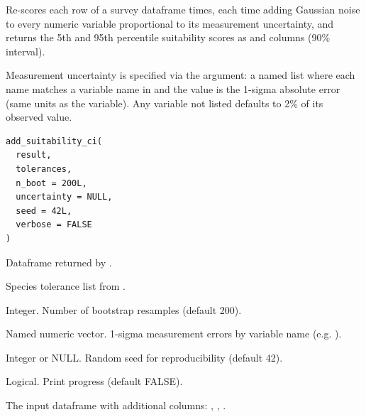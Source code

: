 \documentclass[a4paper]{book}
\begin{document}
%
\begin{Description}
Re-scores each row of a survey dataframe  times, each time adding
Gaussian noise to every numeric variable proportional to its measurement
uncertainty, and returns the 5th and 95th percentile suitability scores as
 and  columns (90\% interval).

Measurement uncertainty is specified via the  argument: a named
list where each name matches a variable name in 
and the value is the 1-sigma absolute error (same units as the variable).
Any variable not listed defaults to 2\% of its observed value.
\end{Description}
%
\begin{Usage}
\begin{verbatim}
add_suitability_ci(
  result,
  tolerances,
  n_boot = 200L,
  uncertainty = NULL,
  seed = 42L,
  verbose = FALSE
)
\end{verbatim}
\end{Usage}
%
\begin{Arguments}
\begin{ldescription}
\item[\code{result}] Dataframe returned by .

\item[\code{tolerances}] Species tolerance list from .

\item[\code{n\_boot}] Integer. Number of bootstrap resamples (default 200).

\item[\code{uncertainty}] Named numeric vector. 1-sigma measurement errors by
variable name (e.g. ).

\item[\code{seed}] Integer or NULL. Random seed for reproducibility (default 42).

\item[\code{verbose}] Logical. Print progress (default FALSE).
\end{ldescription}
\end{Arguments}
%
\begin{Value}
The input dataframe with additional columns:
, , .
\end{Value}
\end{document}
